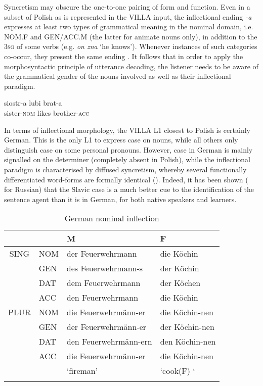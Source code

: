 Syncretism may obscure the one-to-one pairing of form and function. Even in a subset of Polish as is represented in the VILLA input, the inflectional ending \textit{-a} expresses at least two types of grammatical meaning in the nominal domain, i.e. NOM.F and GEN/ACC.M (the latter for animate nouns only), in addition to the 3\textsc{sg} of some verbs (e.g. \textit{on zna} ‘he knows’). Whenever instances of such categories co-occur, they present the same ending . It follows that in order to apply the morphosyntactic principle of utterance decoding, the listener needs to be aware of the grammatical gender of the nouns involved as well as their inflectional paradigm.

\ea%
    \label{ex:02:5}
    \gll    siostr-a lubi brat-a\\
            sister-\textsc{nom}  likes  brother-\textsc{acc}\\
    \z

In terms of inflectional morphology, the VILLA L1 closest to Polish is certainly German. This is the only L1 to express case on nouns, while all others only distinguish case on some personal pronouns. However, case in German is mainly signalled on the determiner (completely absent in Polish), while the inflectional paradigm is characterised by diffused syncretism, whereby several functionally differentiated word-forms are formally identical (). Indeed, it has been shown (\citealt{KempeMacWhinney1998, KempeMacWhinney1999} for Russian) that the Slavic case is a much better cue to the identification of the sentence agent than it is in German, for both native speakers and learners.

\begin{table}
    \begin{tabularx}{\textwidth}{lXll}
    \lsptoprule
        \multicolumn{1}{c}{} &  & M & F\\
    \midrule
        \multicolumn{1}{c}{SING} & NOM & der Feuerwehrmann & die Köchin\\
        & GEN & des Feuerwehrmann-s & der Köchin\\
         & DAT & dem Feuerwehrmann & der Köchen\\
         & ACC & den Feuerwehrmann & die Köchin\\
         \midrule
        \multicolumn{1}{c}{PLUR} & NOM & die Feuerwehrmänn-er & die Köchin-nen\\
        & GEN & der Feuerwehrmänn-er & der Köchin-nen\\
         & DAT & den Feuerwehrmänn-ern & den Köchin-nen\\
         & ACC & die Feuerwehrmänn-er & die Köchin-nen\\
        \multicolumn{1}{c}{} &  & ‘fireman’ & ‘cook(F) ‘\\
\lspbottomrule
    \end{tabularx}
    \caption{German nominal inflection}
    \label{tab:02:4a}
\end{table}

